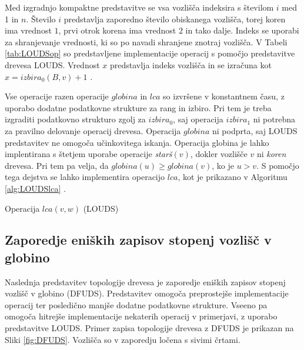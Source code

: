 Med izgradnjo kompaktne predstavitve se vsa vozlišča indeksira s številom $i$ med 1 in $n$. Število $i$ predstavlja zaporedno število obiskanega vozlišča, torej koren ima vrednost $1$, prvi otrok korena ima vrednost $2$ in tako dalje. Indeks se uporabi za shranjevanje vrednosti, ki so po navadi shranjene znotraj vozlišča. V Tabeli \ref{tab:LOUDSop} so predstavljene implementacije operacij s pomočjo predstavitve drevesa LOUDS. Vrednost $x$ predstavlja indeks vozlišča in se izračuna kot $x=izbira_0(B,v)+1$ \cite{Navarro2016}.


Vse operacije razen operacije $globina$ in $lca$ so izvršene v konstantnem času, z uporabo dodatne podatkovne strukture za rang in izbiro. Pri tem je treba izgraditi podatkovno strukturo zgolj za $izbira_0$, saj operacija $izbira_1$ ni potrebna za pravilno delovanje operacij drevesa. Operacija $globina$ ni podprta, saj LOUDS predstavitev ne omogoča učinkovitega iskanja. Operacija globina je lahko implentirana s štetjem uporabe operacije \textit{starš}$(v)$, dokler vozlišče $v$ ni \textit{koren} drevesa. Pri tem pa velja, da $globina(u)\ge globina(v)$, ko je $u>v$. S pomočjo tega dejstva se lahko implementira operacijo $lca$, kot je prikazano v Algoritmu \ref{alg:LOUDSlca} \cite{Navarro2016}.
 
\begin{algorithm}[hbt]

\caption{Operacija $lca(v,w)$ (LOUDS)}\label{alg:LOUDSlca}
{
    
}
\end{algorithm}


\subsection{Zaporedje eniških zapisov stopenj vozlišč v globino}\label{sec:DFUDS}

Naslednja predstavitev topologije drevesa je zaporedje eniških zapisov stopenj vozlišč v globino (DFUDS). Predstavitev omogoča preprostejše implementacije operacij ter posledično manjše dodatne podatkovne strukture. Vseeno pa omogoča hitrejše implementacije nekaterih operacij v primerjavi, z uporabo predstavitve LOUDS. Primer zapisa topologije drevesa z DFUDS je prikazan na Sliki \ref{fig:DFUDS}. Vozlišča so v zaporedju ločena s sivimi črtami.

